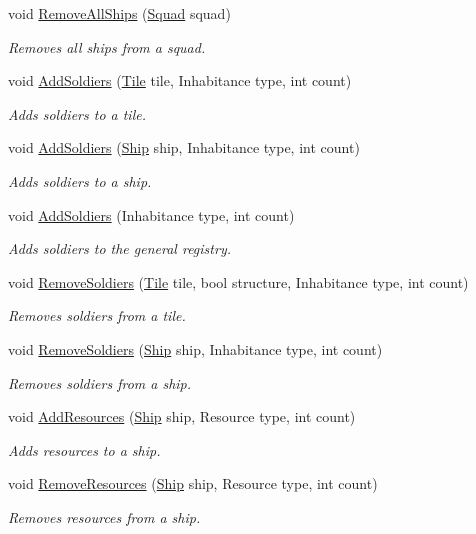 \begin{DoxyCompactItemize}
void \hyperlink{class_player_ac9832514df13d86317ab3c52adde3be9}{Remove\+All\+Ships} (\hyperlink{class_squad}{Squad} squad)
\begin{DoxyCompactList}\small\item\em Removes all ships from a squad. \end{DoxyCompactList}\item 
void \hyperlink{class_player_a60cbe4a79b74c068b51b0862c451f1a8}{Add\+Soldiers} (\hyperlink{class_tile}{Tile} tile, Inhabitance type, int count)
\begin{DoxyCompactList}\small\item\em Adds soldiers to a tile. \end{DoxyCompactList}\item 
void \hyperlink{class_player_ac709c13eb4440f32f7c9220feac3c511}{Add\+Soldiers} (\hyperlink{class_ship}{Ship} ship, Inhabitance type, int count)
\begin{DoxyCompactList}\small\item\em Adds soldiers to a ship. \end{DoxyCompactList}\item 
void \hyperlink{class_player_a8092a2162d3aa83ce05fa12fe2ac3671}{Add\+Soldiers} (Inhabitance type, int count)
\begin{DoxyCompactList}\small\item\em Adds soldiers to the general registry. \end{DoxyCompactList}\item 
void \hyperlink{class_player_a6aa0e9cc98441f260ef850ebc08d04e8}{Remove\+Soldiers} (\hyperlink{class_tile}{Tile} tile, bool structure, Inhabitance type, int count)
\begin{DoxyCompactList}\small\item\em Removes soldiers from a tile. \end{DoxyCompactList}\item 
void \hyperlink{class_player_a6f8bdffca632c22a6aefea9440054680}{Remove\+Soldiers} (\hyperlink{class_ship}{Ship} ship, Inhabitance type, int count)
\begin{DoxyCompactList}\small\item\em Removes soldiers from a ship. \end{DoxyCompactList}\item 
void \hyperlink{class_player_a23f2eb75dd95c44375428a309eb6cac0}{Add\+Resources} (\hyperlink{class_ship}{Ship} ship, Resource type, int count)
\begin{DoxyCompactList}\small\item\em Adds resources to a ship. \end{DoxyCompactList}\item 
void \hyperlink{class_player_a945bc71e57184ce896e3f20f590cf5a8}{Remove\+Resources} (\hyperlink{class_ship}{Ship} ship, Resource type, int count)
\begin{DoxyCompactList}\small\item\em Removes resources from a ship. \end{DoxyCompactList}\end{DoxyCompactItemize}
